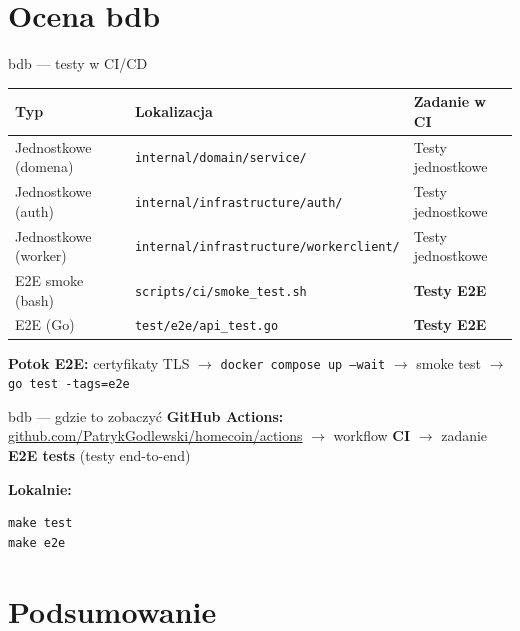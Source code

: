 \documentclass[aspectratio=169,11pt]{beamer}
\begin{document}
\section{Ocena bdb}

\begin{frame}{bdb --- testy w CI/CD}
  \small
  \begin{tabular}{@{}lll@{}}
    \toprule
    \textbf{Typ} & \textbf{Lokalizacja} & \textbf{Zadanie w CI} \\
    \midrule
    Jednostkowe (domena) & \texttt{internal/domain/service/} & Testy jednostkowe \\
    Jednostkowe (auth) & \texttt{internal/infrastructure/auth/} & Testy jednostkowe \\
    Jednostkowe (worker) & \texttt{internal/infrastructure/workerclient/} & Testy jednostkowe \\
    E2E smoke (bash) & \texttt{scripts/ci/smoke\_test.sh} & \textbf{Testy E2E} \\
    E2E (Go) & \texttt{test/e2e/api\_test.go} & \textbf{Testy E2E} \\
    \bottomrule
  \end{tabular}

  \vspace{0.5em}
  \normalsize
  \textbf{Potok E2E:} certyfikaty TLS $\rightarrow$ \texttt{docker compose up --wait} $\rightarrow$ smoke test $\rightarrow$ \texttt{go test -tags=e2e}
\end{frame}

\begin{frame}[fragile]{bdb --- gdzie to zobaczyć}
  \textbf{GitHub Actions:} \\
  \href{https://github.com/PatrykGodlewski/homecoin/actions}{github.com/PatrykGodlewski/homecoin/actions}
  $\rightarrow$ workflow \textbf{CI} $\rightarrow$ zadanie \textbf{E2E tests} (testy end-to-end)

  \vspace{0.6em}
  \textbf{Lokalnie:}
  \begin{lstlisting}
make test
make e2e
  \end{lstlisting}
\end{frame}

\section{Podsumowanie}
\end{document}
